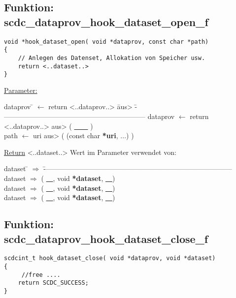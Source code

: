 \subsection{\textbf{Funktion:} scdc\_dataprov\_hook\_dataset\_open\_f}\label{scdc_dataprov_hook_dataset_open_f}
\begin{lstlisting}[escapechar={~}]
void *hook_dataset_open( void *dataprov, const char *path)
{
	// Anlegen des Datenset, Allokation von Speicher usw.
	return <..dataset..>
}
\end{lstlisting}

\underline{Parameter:}
\begin{tabbing}
dataprov \= $\leftarrow$ return <..dataprov..> \= aus> \= --------------------------------------------------------------- \kill
dataprov \> $\leftarrow$ return <..dataprov..> \> aus> \> ( \underline{~~~~} )\\
path \> $\leftarrow$ uri                       \> aus> \> ( (const char \textbf{*uri}, ...) )\\
\end{tabbing}
\underline{Return} <..dataset..> Wert im Parameter verwendet von:
\begin{tabbing}
dataset \= $\Rightarrow$ \= ---------------------------------------------------------------------------------- \kill
dataset \> $\Rightarrow$ \> ( \underline{~~}, void \textbf{*dataset}, \underline{~~})\\
dataset \> $\Rightarrow$ \> ( \underline{~~}, void \textbf{*dataset}, \underline{~~})\\
dataset \> $\Rightarrow$ \> ( \underline{~~}, void \textbf{*dataset}, \underline{~~})\\
\end{tabbing}



\subsection{\textbf{Funktion:} scdc\_dataprov\_hook\_dataset\_close\_f}\label{scdc_dataprov_hook_dataset_close_f}
\begin{lstlisting}[escapechar={~}]
scdcint_t hook_dataset_close( void *dataprov, void *dataset)
{
	 //free ....
	return SCDC_SUCCESS;
}
\end{lstlisting}

